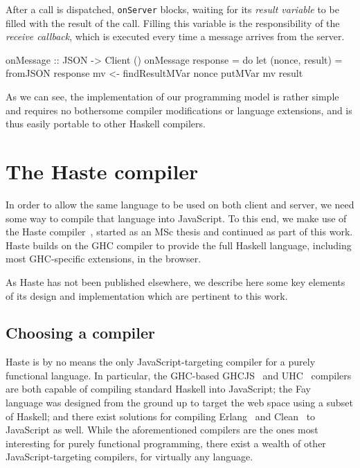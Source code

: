 \documentclass[preprint]{sigplanconf}
\begin{document}
After a call is dispatched, \lstinline!onServer! blocks, waiting for its
\emph{result variable} to be filled with the result of the call. Filling this
variable is the responsibility of the \emph{receive callback}, which is
executed every time a message arrives from the server.

\begin{code}
onMessage :: JSON -> Client ()
onMessage response = do
  let (nonce, result) = fromJSON response
  mv <- findResultMVar nonce
  putMVar mv result
\end{code}

As we can see, the implementation of our programming model is rather simple
and requires no bothersome compiler modifications or language extensions,
and is thus easily portable to other Haskell compilers.

\section{The Haste compiler}\label{sec:haste}

In order to allow the same language to be used on both client and server, we
need some way to compile that language into JavaScript. To this end, we make
use of the Haste compiler\ \cite{haste}, started as an MSc thesis and continued
as part of this work. Haste builds on the GHC compiler to provide the full
Haskell language, including most GHC-specific extensions, in the browser.

As Haste has not been published elsewhere, we describe here some key elements
of its design and implementation which are pertinent to this work.

\subsection{Choosing a compiler}

Haste is by no means the only JavaScript-targeting compiler for a purely
functional language. In particular, the GHC-based GHCJS\ \cite{ghcjs} and
UHC\ \cite{uhc} compilers are both capable of compiling standard Haskell into
JavaScript; the Fay\ \cite{fay} language was designed from the ground up to
target the web space using a subset of Haskell; and there exist solutions for
compiling Erlang\ \cite{jserlang} and Clean\ \cite{jsclean} to JavaScript as
well. While the aforementioned compilers are the ones most interesting for
purely functional programming, there exist a wealth of other
JavaScript-targeting compilers, for virtually any language.
\end{document}
